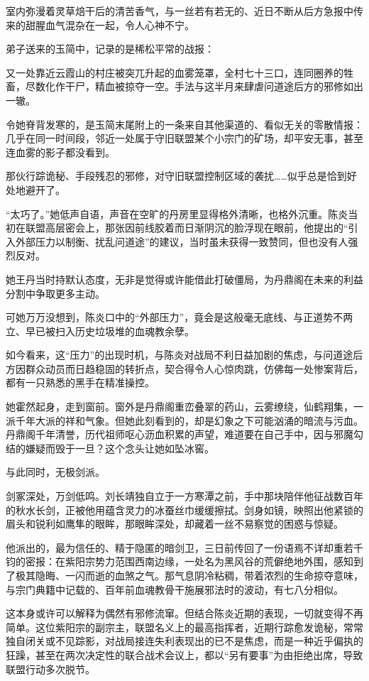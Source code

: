 室内弥漫着灵草焙干后的清苦香气，与一丝若有若无的、近日不断从后方急报中传来的甜腥血气混杂在一起，令人心神不宁。

弟子送来的玉简中，记录的是稀松平常的战报：

又一处靠近云霞山的村庄被突兀升起的血雾笼罩，全村七十三口，连同圈养的牲畜，尽数化作干尸，精血被掠夺一空。手法与这半月来肆虐问道途后方的邪修如出一辙。

令她脊背发寒的，是玉简末尾附上的一条来自其他渠道的、看似无关的零散情报：几乎在同一时间段，邻近一处属于守旧联盟某个小宗门的矿场，却平安无事，甚至连血雾的影子都没看到。

那伙行踪诡秘、手段残忍的邪修，对守旧联盟控制区域的袭扰……似乎总是恰到好处地避开了。

“太巧了。”她低声自语，声音在空旷的丹房里显得格外清晰，也格外沉重。陈炎当初在联盟高层密会上，那张因前线胶着而日渐阴沉的脸浮现在眼前，他提出的“引入外部压力以制衡、扰乱问道途”的建议，当时虽未获得一致赞同，但也没有人强烈反对。

她王丹当时持默认态度，无非是觉得或许能借此打破僵局，为丹鼎阁在未来的利益分割中争取更多主动。

可她万万没想到，陈炎口中的“外部压力”，竟会是这般毫无底线、与正道势不两立、早已被扫入历史垃圾堆的血魂教余孽。

如今看来，这“压力”的出现时机，与陈炎对战局不利日益加剧的焦虑，与问道途后方因群众动员而日趋稳固的转折点，契合得令人心惊肉跳，仿佛每一处惨案背后，都有一只熟悉的黑手在精准操控。

她霍然起身，走到窗前。窗外是丹鼎阁重峦叠翠的药山，云雾缭绕，仙鹤翔集，一派千年大派的祥和气象。但她此刻看到的，却是幻象之下可能汹涌的暗流与污血。丹鼎阁千年清誉，历代祖师呕心沥血积累的声望，难道要在自己手中，因与邪魔勾结的嫌疑而毁于一旦？这个念头让她如坠冰窖。

\vspace{2em}

与此同时，无极剑派。

剑冢深处，万剑低鸣。刘长靖独自立于一方寒潭之前，手中那块陪伴他征战数百年的秋水长剑，正被他用蕴含灵力的冰蚕丝巾缓缓擦拭。剑身如镜，映照出他紧锁的眉头和锐利如鹰隼的眼眸，那眼眸深处，却藏着一丝不易察觉的困惑与惊疑。

他派出的，最为信任的、精于隐匿的暗剑卫，三日前传回了一份语焉不详却重若千钧的密报：在紫阳宗势力范围西南边缘，一处名为黑风谷的荒僻绝地外围，感知到了极其隐晦、一闪而逝的血煞之气。那气息阴冷粘稠，带着浓烈的生命掠夺意味，与宗门典籍中记载的、百年前血魂教骨干施展邪法时的波动，有七八分相似。

这本身或许可以解释为偶然有邪修流窜。但结合陈炎近期的表现，一切就变得不再简单。这位紫阳宗的副宗主，联盟名义上的最高指挥者，近期行踪愈发诡秘，常常独自闭关或不见踪影，对战局接连失利表现出的已不是焦虑，而是一种近乎偏执的狂躁，甚至在两次决定性的联合战术会议上，都以“另有要事”为由拒绝出席，导致联盟行动多次脱节。

